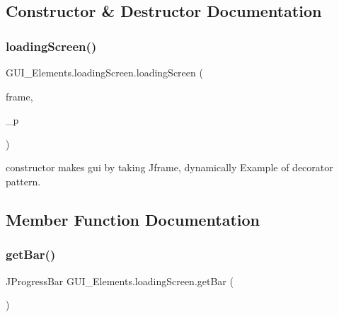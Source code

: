 \subsection{Constructor \& Destructor Documentation}
\hypertarget{class_g_u_i___elements_1_1loading_screen_a0fc0f5ae4d7ebb422ca36364ccc848b9}{}\label{class_g_u_i___elements_1_1loading_screen_a0fc0f5ae4d7ebb422ca36364ccc848b9} 
\subsubsection{\texorpdfstring{loading\+Screen()}{loadingScreen()}}
{\footnotesize\ttfamily G\+U\+I\+\_\+\+Elements.\+loading\+Screen.\+loading\+Screen (\begin{DoxyParamCaption}\item[{J\+Frame}]{frame,  }\item[{int}]{\+\_\+p }\end{DoxyParamCaption})}

constructor makes gui by taking Jframe, dynamically Example of decorator pattern. 

\subsection{Member Function Documentation}
\hypertarget{class_g_u_i___elements_1_1loading_screen_a1cd168a3031086c3d15708213dd11a4b}{}\label{class_g_u_i___elements_1_1loading_screen_a1cd168a3031086c3d15708213dd11a4b} 
\subsubsection{\texorpdfstring{get\+Bar()}{getBar()}}
{\footnotesize\ttfamily J\+Progress\+Bar G\+U\+I\+\_\+\+Elements.\+loading\+Screen.\+get\+Bar (\begin{DoxyParamCaption}{ }\end{DoxyParamCaption})}

\hypertarget{class_g_u_i___elements_1_1loading_screen_a565b95f52e78c18e62ccb633ebb9fc49}{}\label{class_g_u_i___elements_1_1loading_screen_a565b95f52e78c18e62ccb633ebb9fc49} 
